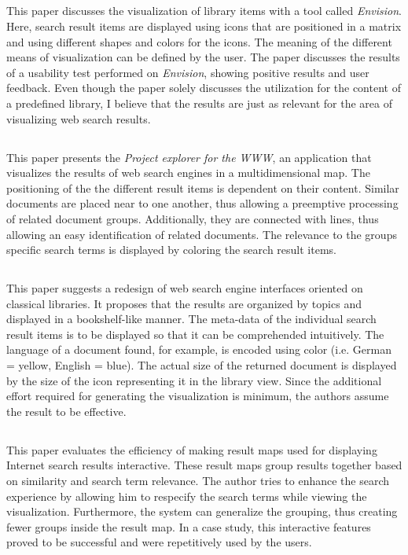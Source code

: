 \subsection{\cite{Nowell1996}}
This paper discusses the visualization of library items with a tool called \emph{Envision}. Here, search result items are displayed using icons that are positioned in a matrix and using different shapes and colors for the icons. The meaning of the different means of visualization can be defined by the user. The paper discusses the results of a usability test performed on \emph{Envision}, showing positive results and user feedback. Even though the paper solely discusses the utilization for the content of a predefined library, I believe that the results are just as relevant for the area of visualizing web search results.

\subsection{\cite{Paulovich2008}}
This paper presents the \emph{Project explorer for the WWW}, an application that visualizes the results of web search engines in a multidimensional map. The positioning of the the different result items is dependent on their content. Similar documents are placed near to one another, thus allowing a preemptive processing of related document groups. Additionally, they are connected with lines, thus allowing an easy identification of related documents. The relevance to the groups specific search terms is displayed by coloring the search result items.

\subsection{\cite{Raubner2000}}
This paper suggests a redesign of web search engine interfaces oriented on classical libraries. It proposes that the results are organized by topics and displayed in a bookshelf-like manner. The meta-data of the individual search result items is to be displayed so that it can be comprehended intuitively. The language of a document found, for example, is encoded using color (i.e. German = yellow, English = blue). The actual size of the returned document is displayed by the size of the icon representing it in the library view. Since the additional effort required for generating the visualization is minimum, the authors assume the result to be effective.

\subsection{\cite{Roussinov1999}}
This paper evaluates the efficiency of making result maps used for displaying Internet search results interactive. These result maps group results together based on similarity and search term relevance. The author tries to enhance the search experience by allowing him to respecify the search terms while viewing the visualization. Furthermore, the system can generalize the grouping, thus creating fewer groups inside the result map. In a case study, this interactive features proved to be successful and were repetitively used by the users.

